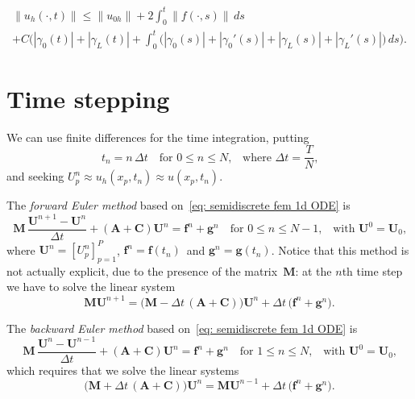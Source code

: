 \begin{corollary}
\begin{multline*}
\|u_h(\cdot,t)\|\le\|u_{0h}\|+2\int_0^t\|f(\cdot,s)\|\,ds\\
	+C\biggl(|\gamma_0(t)|+|\gamma_L(t)|
	+\int_0^t\bigl(|\gamma_0(s)|+|\gamma_0'(s)|
	+|\gamma_L(s)|+|\gamma_L'(s)|\bigr)\,ds\biggr).
\end{multline*}
\end{corollary}

\section{Time stepping}\label{sec: time stepping}
We can use finite differences for the time integration, putting
\begin{equation}\label{eq: uniform tn}
t_n=n\,\Delta t\quad\text{for $0\le n\le N$,}
    \quad\text{where $\Delta t=\frac{T}{N}$,}
\end{equation}
and seeking $U^n_p\approx u_h(x_p,t_n)\approx u(x_p,t_n)$.

\begin{example}
The \emph{forward Euler method} based on~\eqref{eq: semidiscrete fem 1d ODE} is
\[
\boldsymbol{M}\,\frac{\boldsymbol{U}^{n+1}-\boldsymbol{U}^n}{\Delta t}
+(\boldsymbol{A}+\boldsymbol{C})\boldsymbol{U}^n=\boldsymbol{f}^n
    +\boldsymbol{g}^n\quad\text{for $0\le n\le N-1$,}
    \quad\text{with $\boldsymbol{U}^0=\boldsymbol{U}_0$,}
\]
where $\boldsymbol{U}^n=[U^n_p]_{p=1}^P$, 
$\boldsymbol{f}^n=\boldsymbol{f}(t_n)$~and 
$\boldsymbol{g}^n=\boldsymbol{g}(t_n)$.  Notice that this method is not 
actually explicit, due to the presence of the matrix~$\boldsymbol{M}$: at the 
$n$th time step we have to solve the linear system
\[
\boldsymbol{M}\boldsymbol{U}^{n+1}=\bigl(\boldsymbol{M}
-\Delta t\,(\boldsymbol{A}+\boldsymbol{C})\bigr)\boldsymbol{U}^n
    +\Delta t\,\bigl(\boldsymbol{f}^n+\boldsymbol{g}^n\bigr).
\]
\end{example}

\begin{example}
The \emph{backward Euler method} based on~\eqref{eq: semidiscrete fem 1d ODE} is
\[
\boldsymbol{M}\,\frac{\boldsymbol{U}^{n}-\boldsymbol{U}^{n-1}}{\Delta t}
+(\boldsymbol{A}+\boldsymbol{C})\boldsymbol{U}^n=\boldsymbol{f}^n
    +\boldsymbol{g}^n\quad\text{for $1\le n\le N$,}
    \quad\text{with $\boldsymbol{U}^0=\boldsymbol{U}_0$,}
\]
which requires that we solve the linear systems
\[
\bigl(\boldsymbol{M}+\Delta t\,(\boldsymbol{A}+\boldsymbol{C})\bigr) 
    \boldsymbol{U}^n=\boldsymbol{M}\boldsymbol{U}^{n-1}
    +\Delta t\,\bigl(\boldsymbol{f}^n+\boldsymbol{g}^n\bigr).
\]
\end{example}

